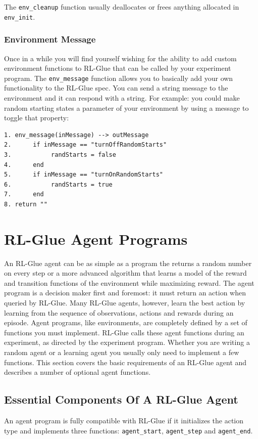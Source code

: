 \documentclass[11pt]{article}
\begin{document}
The \texttt{env\_cleanup} function usually deallocates or frees anything allocated in \texttt{env\_init}.

\subsubsection{Environment Message}
Once in a while you will find yourself wishing for the ability to add custom environment functions to RL-Glue that can be called by your experiment program. The \texttt{env\_message} function allows you to basically add your own functionality to the RL-Glue spec. You can send a string message to the environment and it can respond with a string. For example: you could make random starting states a parameter of your environment by using a message to toggle that property:
\begin{verbatim}
1. env_message(inMessage) --> outMessage
2.      if inMessage == "turnOffRandomStarts"  
3.           randStarts = false
4.      end 
5.      if inMessage == "turnOnRandomStarts"  
6.           randStarts = true
7.      end 
8. return ""
\end{verbatim}


\section{RL-Glue Agent Programs}
\label{agent}
An RL-Glue agent can be as simple as a program the returns a random number on every step or a more advanced algorithm that learns a model of the reward and transition functions of the environment while maximizing reward. The agent program is a decision maker first and foremost: it must return an action when queried by RL-Glue. Many RL-Glue agents, however, learn the best action by learning from the sequence of observations, actions and rewards during an episode. Agent programs, like environments, are completely defined by a set of functions you must implement. RL-Glue calls these agent functions during an experiment, as directed by the experiment program. Whether you are writing a random agent or a learning agent you usually only need  to implement a few functions. This section covers the basic requirements of an RL-Glue agent and describes a number of optional agent functions.
\subsection{Essential Components Of A RL-Glue Agent}
\label{agentp1}

An agent program is fully compatible with RL-Glue if it initializes the action type and implements three functions: \texttt{agent\_start}, \texttt{agent\_step} and \texttt{agent\_end}. 
\end{document}
